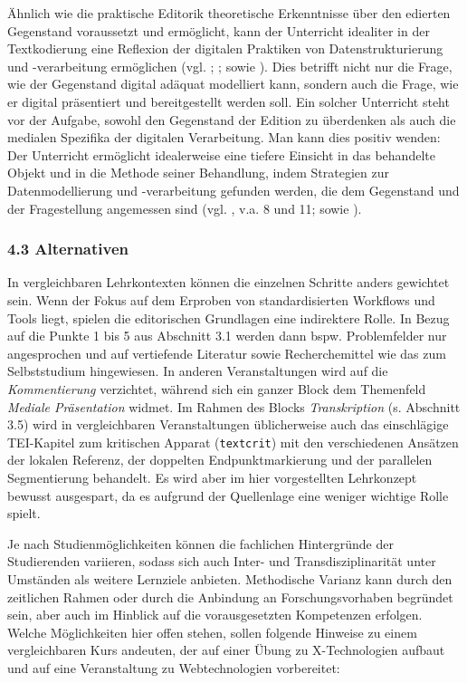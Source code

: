 \documentclass[
          a4paper,
        ]{article}
\newcommand{\passthrough}[1]{#1}
\begin{document}
Ähnlich wie die praktische Editorik theoretische Erkenntnisse über den
edierten Gegenstand voraussetzt und ermöglicht, kann der Unterricht
idealiter in der Textkodierung eine Reflexion der digitalen Praktiken
von Datenstrukturierung und -verarbeitung ermöglichen (vgl.
;
; sowie
). Dies betrifft nicht nur die
Frage, wie der Gegenstand digital adäquat modelliert kann, sondern auch
die Frage, wie er digital präsentiert und bereitgestellt werden soll.
Ein solcher Unterricht steht vor der Aufgabe, sowohl den Gegenstand der
Edition zu überdenken als auch die medialen Spezifika der digitalen
Verarbeitung. Man kann dies positiv wenden: Der Unterricht ermöglicht
idealerweise eine tiefere Einsicht in das behandelte Objekt und in die
Methode seiner Behandlung, indem Strategien zur Datenmodellierung und
-verarbeitung gefunden werden, die dem Gegenstand und der Fragestellung
angemessen sind (vgl. , v.a.
8 und 11; sowie ).

\subsubsection{4.3 Alternativen}\label{alternativen}

In vergleichbaren Lehrkontexten können die einzelnen Schritte anders
gewichtet sein. Wenn der Fokus auf dem Erproben von standardisierten
Workflows und Tools liegt, spielen die editorischen Grundlagen eine
indirektere Rolle. In Bezug auf die Punkte 1 bis 5 aus Abschnitt 3.1
werden dann bspw. Problemfelder nur angesprochen und auf vertiefende
Literatur sowie Recherchemittel wie das zum Selbststudium hingewiesen.
In anderen Veranstaltungen wird auf die \emph{Kommentierung} verzichtet,
während sich ein ganzer Block dem Themenfeld \emph{Mediale Präsentation}
widmet. Im Rahmen des Blocks \emph{Transkription} (s. Abschnitt 3.5)
wird in vergleichbaren Veranstaltungen üblicherweise auch das
einschlägige TEI-Kapitel zum kritischen Apparat
(\passthrough{\lstinline!textcrit!}) mit den verschiedenen Ansätzen der
lokalen Referenz, der doppelten Endpunktmarkierung und der parallelen
Segmentierung behandelt. Es wird aber im hier vorgestellten Lehrkonzept
bewusst ausgespart, da es aufgrund der Quellenlage eine weniger wichtige
Rolle spielt.

Je nach Studienmöglichkeiten können die fachlichen Hintergründe der
Studierenden variieren, sodass sich auch Inter- und Transdisziplinarität
unter Umständen als weitere Lernziele anbieten. Methodische Varianz kann
durch den zeitlichen Rahmen oder durch die Anbindung an
Forschungsvorhaben begründet sein, aber auch im Hinblick auf die
vorausgesetzten Kompetenzen erfolgen. Welche Möglichkeiten hier offen
stehen, sollen folgende Hinweise zu einem vergleichbaren Kurs andeuten,
der auf einer Übung zu X-Technologien aufbaut und auf eine Veranstaltung
zu Webtechnologien vorbereitet:
\end{document}
